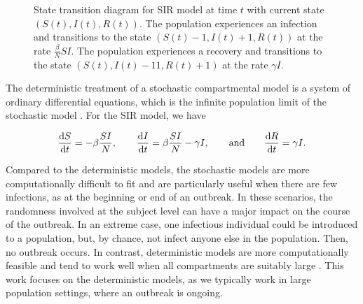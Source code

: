 \begin{figure}
    \centering
    \caption[State transition diagram for SIR model.]{State transition diagram for SIR model at time \( t \) with current state \( (S(t), I(t), R(t)) \).
    The population experiences an infection and transitions to the state \( (S(t)-1, I(t)+1, R(t)) \) at the rate \( \frac{\beta}{N}SI \).
    The population experiences a recovery and transitions to the state \( (S(t), I(t)-11, R(t)+1) \) at the rate \( \gamma I \).
    }
    \label{ch_2:fig:stocastic_SIR}
\end{figure}

The deterministic treatment of a stochastic compartmental model is a system of ordinary differential equations, which is the infinite population limit of the stochastic model \citep{Greenwood2009}.
For the SIR model, we have 

\begin{equation}
    \frac{\mathrm{d} S}{\mathrm{d} t} = -\beta \frac{SI}{N}, \qquad
    \frac{\mathrm{d} I}{\mathrm{d} t} = \beta \frac{SI}{N} - \gamma I, \qquad
    \text{and} \qquad
    \frac{\mathrm{d} R}{\mathrm{d} t} = \gamma I
    \text{.}
\label{ch_2:SIR_diff_eq}
\end{equation}

Compared to the deterministic models, the stochastic models are more computationally difficult to fit and are particularly useful when there are few infections, as at the beginning or end of an outbreak.
In these scenarios, the randomness involved at the subject level can have a major impact on the course of the outbreak.
In an extreme case, one infectious individual could be introduced to a population, but, by chance, not infect anyone else in the population.
Then, no outbreak occurs.
In contrast, deterministic models are more computationally feasible and tend to work well when all compartments are suitably large \citep{doi:10.1098/rspb.2015.0347}.
This work focuses on the deterministic models, as we typically work in large population settings, where an outbreak is ongoing.

